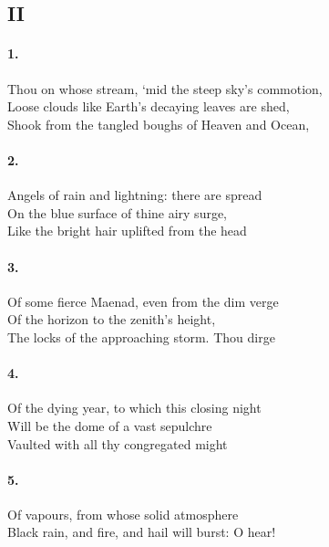 \documentclass{doc}
\begin{document}
		\subsection{II}
			\paragraph{1.}
				Thou on whose stream, ‘mid the steep sky’s commotion, \\
				Loose clouds like Earth’s decaying leaves are shed, \\
				Shook from the tangled boughs of Heaven and Ocean,
			\paragraph{2.}
				Angels of rain and lightning: there are spread \\
				On the blue surface of thine airy surge, \\
				Like the bright hair uplifted from the head
			\paragraph{3.}
				Of some fierce Maenad, even from the dim verge \\
				Of the horizon to the zenith’s height, \\
				The locks of the approaching storm. Thou dirge
			\paragraph{4.}
				Of the dying year, to which this closing night \\
				Will be the dome of a vast sepulchre \\
				Vaulted with all thy congregated might
			\paragraph{5.}
				Of vapours, from whose solid atmosphere \\
				Black rain, and fire, and hail will burst: O hear!
\end{document}
